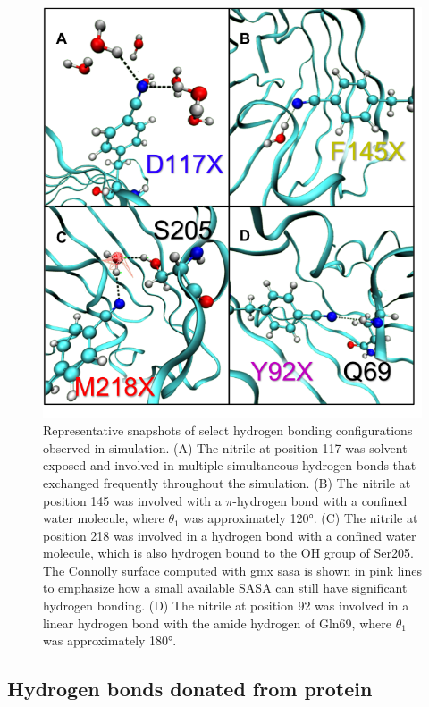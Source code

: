 \begin{figure}
    \center
    \includegraphics[width=\single]{figures-gfp-hbond/snapshots.png}
    \caption[Representative snapshots of select hydrogen bonding configurations observed in simulation]{
        Representative snapshots of select hydrogen bonding configurations observed in simulation. 
        (A) The nitrile at position 117 was solvent exposed and involved in multiple simultaneous hydrogen bonds that exchanged frequently throughout the simulation. 
        (B) The nitrile at position 145 was involved with a $\pi$-hydrogen bond with a confined water molecule, where $\theta_1$ was approximately \ang{120}. 
        (C) The nitrile at position 218 was involved in a hydrogen bond with a confined water molecule, which is also hydrogen bound to the OH group of Ser205. 
        The Connolly surface computed with gmx sasa is shown in pink lines to emphasize how a small available SASA can still have significant hydrogen bonding. 
        (D) The nitrile at position 92 was involved in a linear hydrogen bond with the amide hydrogen of Gln69, where $\theta_1$ was approximately \ang{180}.
    }
    \label{fig:hbond-snapshot}
\end{figure}

\subsection{Hydrogen bonds donated from protein}

